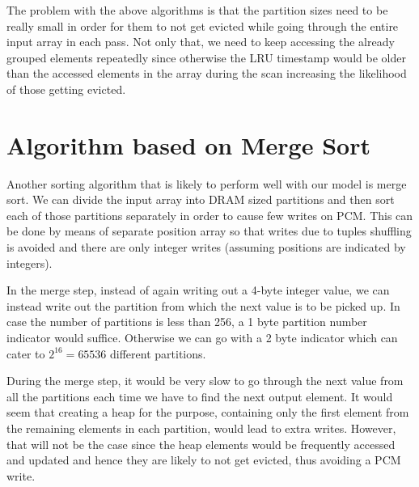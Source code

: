 The problem with the above algorithms is that the partition sizes need to be really small in order for them to not get evicted while going through the entire input array in each pass. Not only that, we need to keep accessing the already grouped elements repeatedly since otherwise the LRU timestamp would be older than the accessed elements in the array during the scan increasing the likelihood of those getting evicted.

\section{Algorithm based on Merge Sort}
Another sorting algorithm that is likely to perform well with our model is merge sort. We can divide the input array into DRAM sized partitions and then sort each of those partitions separately in order to cause few writes on PCM. This can be done by means of separate position array so that writes due to tuples shuffling is avoided and there are only integer writes (assuming positions are indicated by integers).

In the merge step, instead of again writing out a 4-byte integer value, we can instead write out the partition from which the next value is to be picked up. In case the number of partitions is less than 256, a 1 byte partition number indicator would suffice. Otherwise we can go with a 2 byte indicator which can cater to $2^{16} = 65536$ different partitions.

During the merge step, it would be very slow to go through the next value from all the partitions each time we have to find the next output element. It would seem that creating a heap for the purpose, containing only the first element from the remaining elements in each partition, would lead to extra writes. However, that will not be the case since the heap elements would be frequently accessed and updated and hence they are likely to not get evicted, thus avoiding a PCM write. 